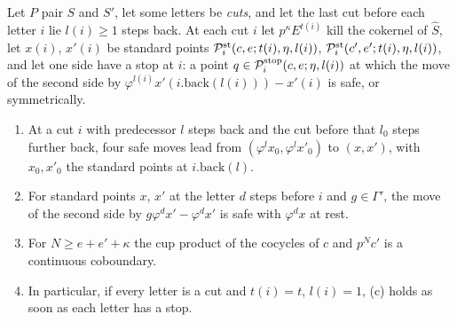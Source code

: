\begin{lemma}\label{lem:walk}
Let $P$ pair $S$ and $S'$, let some letters be \emph{cuts}, and let the last cut before each letter $i$ lie $l(i)\ge1$ steps back. At each cut $i$ let $p^\kappa E^{t(i)}$ kill the cokernel of $\hat S$, let $x(i)$, $x'(i)$ be standard points
$\mathcal P^{\rm st}_i(c,e;t(i),\eta,l(i))$, $\mathcal P^{\rm st}_i(c',e';t(i),\eta,l(i))$, and let one side have a stop at $i$: a point $q\in\mathcal P^{\rm stop}_i(c,e;\eta,l(i))$ at which the move of the second side by $\varphi^{l(i)}x'(i.\mathrm{back}(l(i)))-x'(i)$ is safe, or symmetrically.
\begin{enumerate}[label=\textup{(\alph*)}]
\item At a cut $i$ with predecessor $l$ steps back and the cut before that $l_0$ steps further back, four safe moves lead from $(\varphi^lx_0,\varphi^lx'_0)$ to $(x,x')$, with $x_0,x'_0$ the standard points at $i.\mathrm{back}(l)$.
\item For standard points $x$, $x'$ at the letter $d$ steps before $i$ and $g\in\Gamma'$, the move of the second side by $g\varphi^dx'-\varphi^dx'$ is safe with $\varphi^dx$ at rest.
\item For $N\ge e+e'+\kappa$ the cup product of the cocycles of $c$ and $p^Nc'$ is a continuous coboundary.
\item In particular, if every letter is a cut and $t(i)=t$, $l(i)=1$, (c) holds as soon as each letter has a stop.
\end{enumerate}
\end{lemma}

